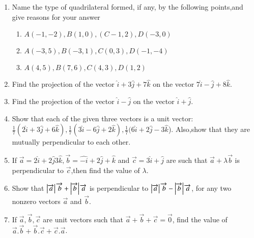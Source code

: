\begin{enumerate}[label=\thesection.\arabic*,ref=\thesection.\theenumi]
\item Name the type of quadrilateral formed, if any, by the following points,and give reasons for your answer
\begin{enumerate}
\item $A(-1,-2), B(1,0), (C-1,2), D(-3,0)$
\item $A(-3,5), B(-3,1), C(0,3), D(-1,-4)$
\item $A(4,5), B(7,6), C(4,3), D(1,2)$
\end{enumerate}
\solution
		
\item Find the projection of the vector $\hat{i}+3\hat{j}+7\hat{k}$ on the vector $7\hat{i}-\hat{j}+8\hat{k}$.
	\\
	\solution
		
\item Find the projection of the vector $\hat{i}-\hat{j}$ on the vector $\hat{i}+\hat{j}$.
	\\
\solution
		
\item Show that each of the given three vectors is a unit vector: 
 $\frac{1}{7}(2\hat{i}+3\hat{j}+6\hat{k}),\frac{1}{7}(3\hat{i}-6\hat{j}+2\hat{k}),\frac{1}{7}(6\hat{i}+2\hat{j}-3\hat{k}$).
Also,show that they are mutually perpendicular to each other.
	\\
	\solution
		
\item If $\overrightarrow {a}=2\hat{i}+2\hat{j}3\hat{k},\overrightarrow {b}=\hat{-i}+2\hat{j}+\hat{k}$ and $\overrightarrow {c}=3\hat{i}+\hat{j}$ are such that $\overrightarrow {a}+\lambda\overrightarrow {b}$ is perpendicular to $\overrightarrow {c}$,then find the value of $\lambda$.
	\\
		
\item Show that $\left\vert\overrightarrow {a}\right\vert\overrightarrow {b}+\left\vert\overrightarrow {b}\right\vert\overrightarrow {a}$ is perpendicular to $\left\vert\overrightarrow {a}\right\vert \overrightarrow {b}-\left\vert\overrightarrow {b}\right\vert \overrightarrow {a}$, for any two nonzero vectors $\overrightarrow {a}$ and $\overrightarrow {b}$.
	\\
	\solution
		
\item If $\overrightarrow {a},\overrightarrow {b},\overrightarrow {c}$ are unit vectors such that $\overrightarrow {a}+\overrightarrow {b}+\overrightarrow {c}=\overrightarrow {0}$, find the value of $\overrightarrow {a}.\overrightarrow {b}+\overrightarrow {b}.\overrightarrow {c}+\overrightarrow {c}.\overrightarrow {a}$.

\end{enumerate}
